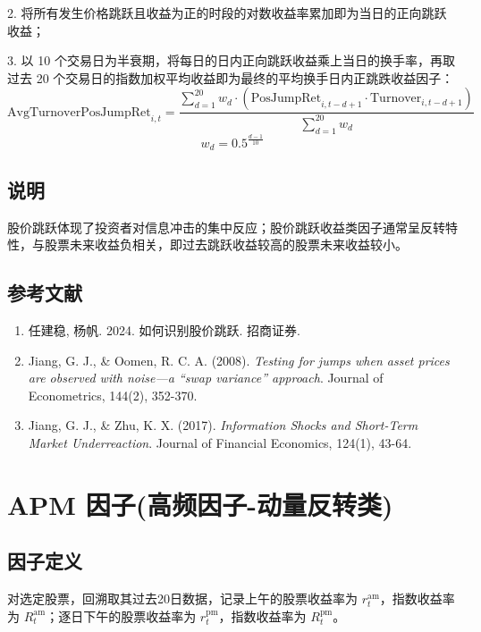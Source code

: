 \documentclass{article}
\begin{document}
2. 将所有发生价格跳跃且收益为正的时段的对数收益率累加即为当日的正向跳跃收益；

3. 以 10 个交易日为半衰期，将每日的日内正向跳跃收益乘上当日的换手率，再取过去 20 个交易日的指数加权平均收益即为最终的平均换手日内正跳跌收益因子：
\begin{equation}
    \mathrm{AvgTurnoverPosJumpRet}_{i,t} = \frac{\sum_{d=1}^{20} w_d \cdot (\mathrm{PosJumpRet}_{i,t-d+1} \cdot \mathrm{Turnover}_{i,t-d+1})}{\sum_{d=1}^{20} w_d}
\end{equation}
\begin{equation}
    w_d = 0.5^{\frac{d-1}{10}}
\end{equation}

\subsection{说明}
股价跳跃体现了投资者对信息冲击的集中反应；股价跳跃收益类因子通常呈反转特性，与股票未来收益负相关，即过去跳跃收益较高的股票未来收益较小。

\subsection{参考文献}
\begin{enumerate}
    \item 任建稳, 杨帆. 2024. 如何识别股价跳跃. 招商证券.
    \item Jiang, G. J., \& Oomen, R. C. A. (2008). \textit{Testing for jumps when asset prices are observed with noise—a “swap variance” approach}. Journal of Econometrics, 144(2), 352-370.
    \item Jiang, G. J., \& Zhu, K. X. (2017). \textit{Information Shocks and Short-Term Market Underreaction}. Journal of Financial Economics, 124(1), 43-64.
\end{enumerate}

\section{APM 因子(高频因子-动量反转类)}

\subsection{因子定义}

对选定股票，回溯取其过去20日数据，记录上午的股票收益率为 \( r_t^{\mathrm{am}} \)，指数收益率为 \( R_t^{\mathrm{am}} \)；逐日下午的股票收益率为 \( r_t^{\mathrm{pm}} \)，指数收益率为 \( R_t^{\mathrm{pm}} \)。
\end{document}
